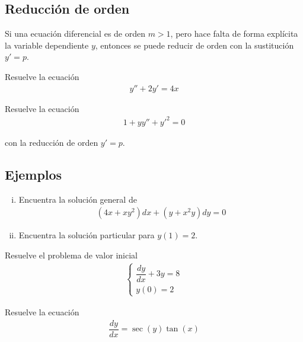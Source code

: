 \subsection{Reducción de orden}
{}
  Si una ecuación diferencial es de orden $m>1$, pero hace falta de forma explícita la variable dependiente $y$, entonces se puede reducir de orden con la sustitución 
  $y'=p$.

{}
  \begin{problema}
   Resuelve la ecuación
   \begin{align}
    y''+2y'=4x
    \end{align}
  \end{problema}


{}
  \begin{problema}
   Resuelve la ecuación 
   \begin{align}
    1+yy''+y'^{2} = 0
    \end{align}
  \end{problema}
con la reducción de orden $y'=p$.

\subsection{Ejemplos}
{}
  \begin{problema}
   \begin{enumerate}[(i)]
     \item Encuentra la solución general de 
     \begin{align}
      \left( 4x+xy^{2} \right)dx+\left( y+x^{2}y \right)dy = 0
      \end{align}
     
     \item Encuentra la solución particular para $y(1)=2$.
\end{enumerate}
  \end{problema}


{}
  Resuelve el problema de valor inicial
  \begin{align}
   \begin{cases}
\dfrac{dy}{dx}+3y=8 \\
y(0)=2
\end{cases}
   \end{align}

{}
  \begin{problema}
   Resuelve la ecuación
   \begin{align}
    \dfrac{dy}{dx} = \sec(y)\tan(x)
    \end{align}
  \end{problema}


